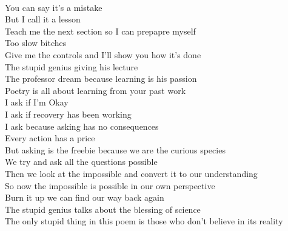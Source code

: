 \documentclass[12pt, b5paper, oneside]{book}
\begin{document}
\\You can say it's a mistake 
\\But I call it a lesson 
\\Teach me the next section so I can prepapre myself 
\\Too slow bitches
\\Give me the controls and I'll show you how it's done 
\\The stupid genius giving his lecture
\\The professor dream because learning is his passion 
\\Poetry is all about learning from your past work 
\\I ask if I'm Okay
\\I ask if recovery has been working 
\\I ask because asking has no consequences
\\Every action has a price 
\\But asking is the freebie because we are the curious species 
\\We try and ask all the questions possible
\\Then we look at the impossible and convert it to our understanding 
\\So now the impossible is possible in our own perspective 
\\Burn it up we can find our way back again
\\The stupid genius talks about the blessing of science 
\\The only stupid thing in this poem is those who don't believe in its reality 


\newpage
\end{document}
